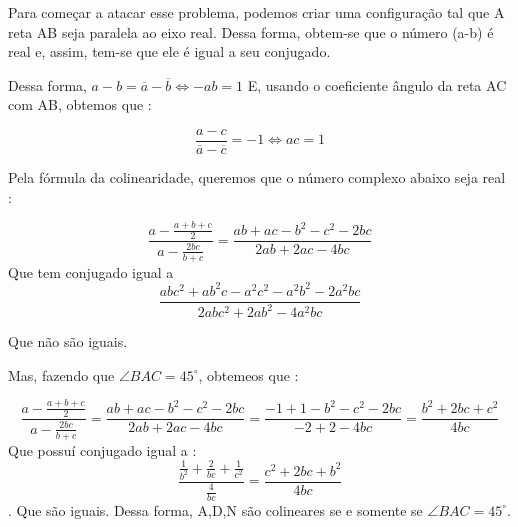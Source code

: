 \documentclass{article}
\begin{document}
Para começar a atacar esse problema, podemos criar uma configuração tal que A reta AB seja paralela ao eixo real. Dessa forma, obtem-se que o número (a-b) é real e, assim, tem-se que ele é igual a seu conjugado.

Dessa forma, $a - b = \overline{a} - \overline{b} \iff -ab = 1$
E, usando o coeficiente ângulo da reta AC com AB, obtemos que :

$$\frac{a-c}{\overline{a}-\overline{c}} = -1 \iff ac = 1$$

Pela fórmula da colinearidade, queremos que o número complexo abaixo seja real : 

$$\frac{a - \frac{a+b+c}{2}}{a - \frac{2bc}{b+c}} = \frac{ab + ac -b^2 -c^2 - 2bc}{2ab + 2ac - 4bc}$$
Que tem conjugado igual a 
$$\frac{abc^2 + ab^ 2 c - a^2c^2 -a^2b^2 -2a^2bc}{2abc^2 + 2ab^2 - 4a^2bc}$$

Que não são iguais.

Mas, fazendo que $\angle BAC = 45^{\circ}$, obtemeos que : 

$$\frac{a - \frac{a+b+c}{2}}{a - \frac{2bc}{b+c}} = \frac{ab + ac -b^2 -c^2 - 2bc}{2ab + 2ac - 4bc} = \frac{-1+1-b^2 -c^2 -2bc}{-2+2 - 4bc}= \frac{b^2 + 2bc + c^2}{4bc}$$
Que possuí conjugado igual a : 
$$\frac{\frac{1}{b^2} + \frac{2}{bc} + \frac{1}{c^2}}{\frac{4}{bc}} = \frac{c^2 + 2bc + b^2}{4bc}$$. Que são iguais. Dessa forma, A,D,N são colineares se e somente se $\angle BAC = 45^{\circ}$.
\end{document}
